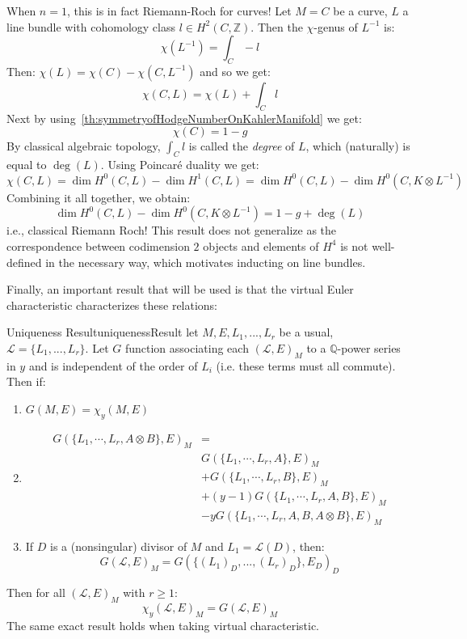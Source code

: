 \documentclass{book}
\newcommand{\Q}{{\mathbb{Q}}}
\newcommand{\Z}{{\mathbb{Z}}}
\newcommand{\CL}{{\mathcal{L}}}
\renewcommand{\deg}{{\operatorname{deg}}}
\begin{document}
When $n = 1$, this is in fact Riemann-Roch for curves! Let $M = C$ be a curve, $L$ a line bundle with
cohomology class $l  \in H^2(C, \Z)$. Then the $\chi$-genus of $L^{-1}$ is:
\[
  \chi(L^{-1}) = \int_C-l
\]
Then: $\chi(L) = \chi(C) - \chi(C, L^{-1})$ and so we get:
\[
  \chi(C, L) = \chi(L) + \int_C l
\]
Next by using~\cref{th:symmetryofHodgeNumberOnKahlerManifold} we get:
\[
  \chi(C) = 1 - g
\]
By classical algebraic topology, $\int_C l$ is called the \emph{degree} of $L$, which (naturally) is equal to
$\deg(L)$. Using Poincar\'e duality we get:
\[
  \chi(C, L) = \dim H^0(C, L) - \dim H^1(C, L) = \dim H^0(C, L) - \dim H^0(C, K\otimes L^{-1})
\]
Combining it all together, we obtain:
\[
  \dim H^0(C, L) - \dim H^0(C, K\otimes L^{-1}) = 1 - g + \deg(L)
\]
i.e., classical Riemann Roch! This result does not generalize as the correspondence between codimension $2$
objects and elements of $H^4$ is not well-defined in the necessary way, which motivates inducting on line
bundles.


Finally, an important result that will be used is that the virtual Euler characteristic characterizes these relations:

\begin{thm}{Uniqueness Result}{uniquenessResult}
  let $M,E, L_1, ..., L_r$ be a usual, $\CL = \{L_1, ..., L_r\}$. Let $G$ function associating each $(\CL,
  E)_M$ to a $\Q$-power series in $y$ and is independent of the order of $L_i$ (i.e. these terms must all
  commute). Then if:
  \begin{enumerate}
    \item $G(M, E) = \chi_y(M,E)$
    \item
  \begin{align*}
  G(\{L_1,\cdots,L_r,A\otimes B\},E)_M &=\\
                 &G(\{L_1,\cdots,L_r,A\},E)_M\\
                 &+ G(\{L_1,\cdots,L_r,B\},E)_M\\
                 &+ (y-1)G(\{L_1,\cdots,L_r,A,B\},E)_M\\
                 &- yG(\{L_1,\cdots,L_r,A,B,A\otimes B\},E)_M
  \end{align*}
  \item If $D$ is a (nonsingular) divisor of $M$ and $L_1 = \CL(D)$, then:
    \[
      G(\CL, E)_M = G(\{(L_1)_D, ..., (L_r)_D\}, E_D)_D
    \]
  \end{enumerate}
  Then for all $(\CL, E)_M$ with $r \ge 1$:
  \[
    \chi_y(\CL, E)_M = G(\CL, E)_M
  \]
  The same exact result holds when taking virtual characteristic.
\end{thm}
\end{document}
